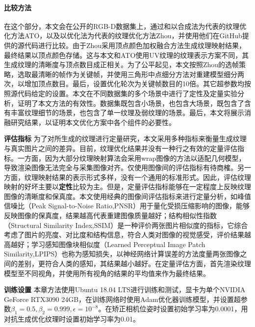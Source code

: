 \paragraph*{\textbf{比较方法}}
在这个部分，本文会在公开的RGB-D数据集上，通过和以合成法为代表的纹理优化方法ATO，以及以优化法为代表的纹理优化方法Zhou，并使用他们在GitHub提供的源代码进行比较。由于Zhou采用顶点颜色加权融合方法生成纹理映射结果，最终结果以顶点颜色存储。这与本文和ATO使用UV纹理的纹理表示方案不同，其生成纹理的清晰度与顶点数目成正相关。为了公平起见，本文按照Zhou的选帧策略，选取最清晰的帧作为关键帧，并使用三角形中点细分方法对重建模型细分两次，以增加顶点数目。最后，设置优化轮次为关键帧数目的10倍。其它超参数均按照源代码给定的设置。本文在不同数据集的多个场景中进行了定性及定量实验分析，证明了本文方法的有效性。数据集既包含小场景，也包含大场景，既包含了含有丰富纹理细节的场景，也包含了单一纹理及弱纹理的场景。最后，本文将展示消融研究结果，以证明本文优化方案中各个组件的必要性。\par
\noindent\textbf{评估指标}\quad
为了对所生成的纹理进行定量研究，本文采用多种指标来衡量生成纹理与真实图片之间的差异。目前，纹理优化结果并没有一种行之有效的定量评估指标。一方面，因为大部分纹理映射算法会采用wrap图像的方法以适配几何模型，导致渲染图像无法完全与采集图像对齐。仅使用图像间的评估指标有待商榷。另一方面，纹理映射结果的表示形式多样，没有一个通用的标准形式。因此，评估纹理映射的好坏主要以\textbf{定性}比较为主。但是，定量评估指标能够在一定程度上反映纹理图像的清晰度和保真度。本文使用经典的图像间评估指标来进行定量分析，如峰值信噪比（Peak Signal-to-Noise Ratio,PNSR）用于量化受损压缩影响的图像，能够反映图像的保真度，结果越高代表重建图像质量越好；结构相似性指数（Structural Similarity Index,SSIM）是一种评价两张图片相似度的指标，它综合考虑了图片的亮度、对比度和结构信息，符合人类对图像的视觉感受，评价结果越高越好；学习感知图像块相似度（Learned Perceptual Image Patch Similarity,LPIPS）也称为感知损失，以神经网络计算误差的方法度量两张图像之间的差别，更符合人类的感知，其结果越小越好。在定量评估方面，首先渲染纹理模型至不同视角，并使用所有视角的结果的平均值来作为最终结果。


\noindent\textbf{训练设置}\quad
本章方法使用Ubuntu 18.04 LTS进行训练和测试，显卡为单个NVIDIA GeForce RTX3090 24GB，在训练网络时使用Adam优化器训练模型，并设置超参数$\beta_1=0.5,\beta_2=0.999,\epsilon =10^{-8}$。在矫正相机位姿时设置初始学习率为0.0001，用对抗生成优化纹理时设置初始学习率为0.01。



